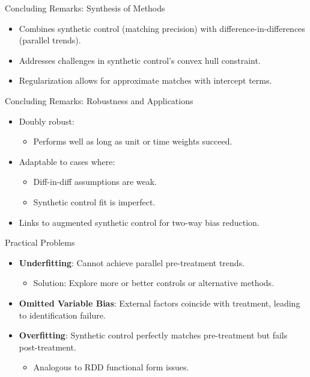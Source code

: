 \documentclass{beamer}
\begin{document}
\begin{frame}{Concluding Remarks: Synthesis of Methods}

\begin{itemize}
    \item Combines synthetic control (matching precision) with difference-in-differences (parallel trends).
    \item Addresses challenges in synthetic control’s convex hull constraint.
    \item Regularization allows for approximate matches with intercept terms.
\end{itemize}

\end{frame}






\begin{frame}{Concluding Remarks: Robustness and Applications}

\begin{itemize}
    \item Doubly robust:
    \begin{itemize}
        \item Performs well as long as unit or time weights succeed.
    \end{itemize}
    \item Adaptable to cases where:
    \begin{itemize}
        \item Diff-in-diff assumptions are weak.
        \item Synthetic control fit is imperfect.
    \end{itemize}
    \item Links to augmented synthetic control for two-way bias reduction.
\end{itemize}

\end{frame}




\begin{frame}{Practical Problems}
\begin{itemize}
\item \textbf{Underfitting}: Cannot achieve parallel pre-treatment trends.
    \begin{itemize}
    \item Solution: Explore more or better controls or alternative methods.
    \end{itemize}
\item \textbf{Omitted Variable Bias}: External factors coincide with treatment, leading to identification failure.
\item \textbf{Overfitting}: Synthetic control perfectly matches pre-treatment but fails post-treatment.
    \begin{itemize}
    \item Analogous to RDD functional form issues.
    \end{itemize}
\end{itemize}
\end{frame}
\end{document}
